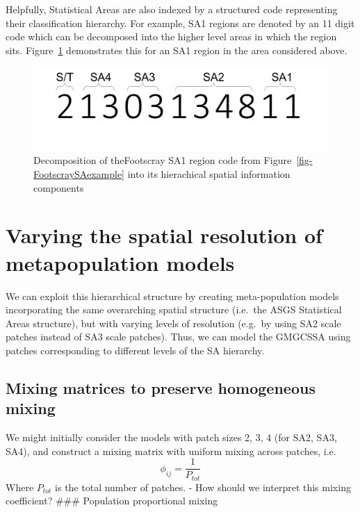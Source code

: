 \documentclass[
  letterpaper,
  DIV=11,
  numbers=noendperiod]{scrreprt}
\begin{document}
Helpfully, Statistical Areas are also indexed by a structured code
representing their classification hierarchy. For example, SA1 regions
are denoted by an 11 digit code which can be decomposed into the higher
level areas in which the region sits. Figure~\ref{fig-FootscraySA1Code}
demonstrates this for an SA1 region in the area considered above.

\begin{figure}

{\centering \includegraphics{FootscraySA1eg.png}

}

\caption{\label{fig-FootscraySA1Code}Decomposition of theFootscray SA1
region code from Figure~\ref{fig-FootscraySAexample} into its
hierachical spatial information components}

\end{figure}

\hypertarget{varying-the-spatial-resolution-of-metapopulation-models}{%
\section{Varying the spatial resolution of metapopulation
models}\label{varying-the-spatial-resolution-of-metapopulation-models}}

We can exploit this hierarchical structure by creating meta-population
models incorporating the same overarching spatial structure (i.e.~the
ASGS Statistical Areas structure), but with varying levels of resolution
(e.g.~by using SA2 scale patches instead of SA3 scale patches). Thus, we
can model the GMGCSSA using patches corresponding to different levels of
the SA hierarchy.

\hypertarget{mixing-matrices-to-preserve-homogeneous-mixing}{%
\subsection{Mixing matrices to preserve homogeneous
mixing}\label{mixing-matrices-to-preserve-homogeneous-mixing}}

We might initially consider the models with patch sizes 2, 3, 4 (for
SA2, SA3, SA4), and construct a mixing matrix with uniform mixing across
patches, i.e.~\[
\phi_{ij} = \frac{1}{P_{tot}}
\] Where \(P_{tot}\) is the total number of patches. - How should we
interpret this mixing coefficient? \#\#\# Population proportional mixing
\end{document}
